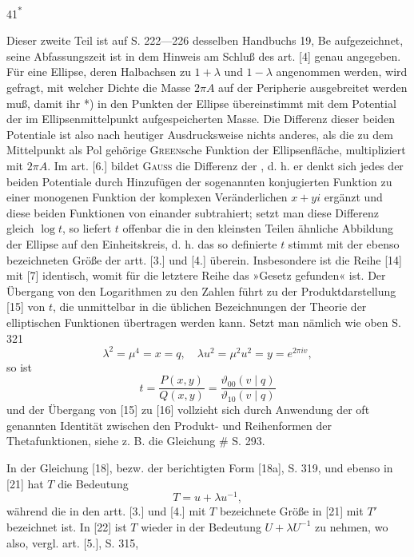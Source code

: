 \par\medskip\hfill41\textsuperscript{*}\par
\clearpage{}
\par\indent Dieser zweite Teil ist auf S. 222---226 desselben Handbuchs 19, Be aufgezeichnet, seine Abfassungszeit ist in dem Hinweis am Schluß des art. [4] genau angegeben. Für eine Ellipse, deren Halbachsen zu $1+\lambda$ und $1-\lambda$ angenommen werden, wird gefragt, mit welcher Dichte die Masse $2\pi A$ auf der Peripherie ausgebreitet werden muß, damit ihr *) in den Punkten der Ellipse übereinstimmt mit dem Potential der im Ellipsenmittelpunkt aufgespeicherten Masse. Die Differenz dieser beiden Potentiale ist also nach heutiger Ausdrucksweise nichts anderes, als die zu dem Mittelpunkt als Pol gehörige \textsc{Green}sche Funktion der Ellipsenfläche, multipliziert mit $2\pi A$. Im art. [6.] bildet \textsc{Gauss} die Differenz der , d. h. er denkt sich jedes der beiden Potentiale \linebreak durch Hinzufügen der sogenannten konjugierten Funktion zu einer monogenen Funktion der komplexen Veränderlichen $x+yi$ ergänzt und diese beiden Funktionen von einander subtrahiert; setzt man diese Differenz gleich $\log t$, so liefert $t$ offenbar die in den kleinsten Teilen ähnliche Abbildung der Ellipse auf den Einheitskreis, d. h. das so definierte $t$ stimmt mit der ebenso bezeichneten Größe der artt. [3.] und [4.] überein. Insbesondere ist die Reihe [14] mit [7] identisch, womit für die letztere Reihe das »Gesetz gefunden« ist. Der Übergang von den Logarithmen zu den Zahlen führt zu der Produktdarstellung [15] von $t$, die unmittelbar in die üblichen Bezeichnungen der Theorie der elliptischen Funktionen übertragen werden kann. Setzt man nämlich wie oben S. 321
\[\lambda^2=\mu^4=x=q,\quad\lambda u^2=\mu^2u^2=y=e^{2\pi iv},\]
\noindent so ist
\[t=\frac{P(x,y)}{Q(x,y)}=\frac{\vartheta_{00}(v\mid q)}{\vartheta_{10}(v\mid q)}\]
\noindent und der Übergang von [15] zu [16] vollzieht sich durch Anwendung der oft genannten Identität zwischen den Produkt- und Reihenformen der Thetafunktionen, siehe z. B. die Gleichung $\#$ S. 293.
\par\indent In der Gleichung [18], bezw. der berichtigten Form [18a], S. 319, und ebenso in [21] hat $T$ die Bedeutung
\[T=u+\lambda u^{-1},\]
\noindent während die in den artt. [3.] und [4.] mit $T$ bezeichnete Größe in [21] mit $T'$ bezeichnet ist. In [22] ist $T$ wieder in der Bedeutung $U+\lambda U^{-1}$ zu nehmen, wo also, vergl. art. [5.], S. 315,
